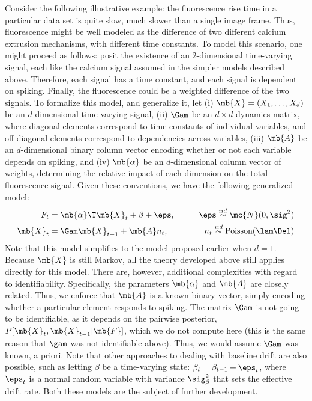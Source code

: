 Consider the following illustrative example: the fluorescence rise time in a particular data set is quite slow, much slower than a single image frame.  Thus, fluorescence might be well modeled as the difference of two different calcium extrusion mechanisms, with different time constants. To model this scenario, one might proceed as follows: posit the existence of an $2$-dimensional time-varying signal, each like the calcium signal assumed in the simpler models described above.  Therefore, each signal has a time constant, and each signal is dependent on spiking.  Finally, the fluorescence could be a weighted difference of the two signals.  To formalize this model, and generalize it, let (i) $\mb{X}=(X_1, \ldots, X_d)$  be an $d$-dimensional time varying signal, (ii) $\Gam$ be an $d\times d$ dynamics matrix, where diagonal elements correspond to time constants of individual variables, and off-diagonal elements correspond to dependencies across variables, (iii) $\mb{A}$ be an $d$-dimensional binary column vector encoding whether or not each variable depends on spiking, and (iv) $\mb{\alpha}$ be an $d$-dimensional column vector of weights, determining the relative impact of each dimension on the total fluorescence signal.  Given these conventions, we have the following generalized model:
\begin{align}
	F_t &= \mb{\alpha}\T \mb{X}_t + \beta + \eps, \qquad& \eps \overset{iid}{\sim} \mc{N}(0,\sig^2) \\
	\mb{X}_t &= \Gam \mb{X}_{t-1} + \mb{A} n_t, & n_t \overset{iid}{\sim} \text{Poisson}(\lam\Del)
\end{align}
Note that this model simplifies to the model proposed earlier when $d=1$.  Because $\mb{X}$ is still Markov, all the theory developed above still applies directly for this model.  There are, however, additional complexities with regard to identifiability.  Specifically, the parameters $\mb{\alpha}$ and $\mb{A}$ are closely related.  Thus, we enforce that $\mb{A}$ is a known binary vector, simply encoding whether a particular element responds to spiking.  The matrix $\Gam$ is not going to be identifiable, as it depends on the pairwise posterior, $P[\mb{X}_t, \mb{X}_{t-1} | \mb{F}]$, which we do not compute here (this is the same reason that $\gam$ was not identifiable above).  Thus,  we would assume $\Gam$ was known, a priori.  Note that other approaches to dealing with baseline drift are also possible, such as letting $\beta$ be a time-varying state: $\beta_t = \beta_{t-1} +  \eps_t$, where $\eps_t$ is a normal random variable with variance $\sig_\beta^2$ that sets the effective drift rate.  Both these models are the subject of further development.

